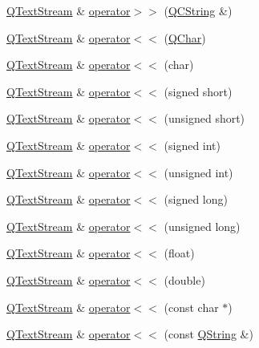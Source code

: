\begin{DoxyCompactItemize}
\hyperlink{class_q_text_stream}{Q\+Text\+Stream} \& \hyperlink{class_q_text_stream_aea7cbf9e70a47fa15f3091fb26d7263d}{operator$>$$>$} (\hyperlink{class_q_c_string}{Q\+C\+String} \&)
\item 
\hyperlink{class_q_text_stream}{Q\+Text\+Stream} \& \hyperlink{class_q_text_stream_a8382325a2a4bd29dc51bf49d8756fc66}{operator$<$$<$} (\hyperlink{class_q_char}{Q\+Char})
\item 
\hyperlink{class_q_text_stream}{Q\+Text\+Stream} \& \hyperlink{class_q_text_stream_aa4ca816ce1b8a1cb25e3d9dfc1d7c4df}{operator$<$$<$} (char)
\item 
\hyperlink{class_q_text_stream}{Q\+Text\+Stream} \& \hyperlink{class_q_text_stream_a09fa4090716c81548496f5f344c61a61}{operator$<$$<$} (signed short)
\item 
\hyperlink{class_q_text_stream}{Q\+Text\+Stream} \& \hyperlink{class_q_text_stream_a678a728c8ea87eacb59c32f58bf33d9a}{operator$<$$<$} (unsigned short)
\item 
\hyperlink{class_q_text_stream}{Q\+Text\+Stream} \& \hyperlink{class_q_text_stream_af4d8f73d592e7dbf1009381c3795bc0b}{operator$<$$<$} (signed int)
\item 
\hyperlink{class_q_text_stream}{Q\+Text\+Stream} \& \hyperlink{class_q_text_stream_aff4f8bd3513a371838b5ec20be5a5889}{operator$<$$<$} (unsigned int)
\item 
\hyperlink{class_q_text_stream}{Q\+Text\+Stream} \& \hyperlink{class_q_text_stream_a35f51b32c584d1e703e1127c8273510d}{operator$<$$<$} (signed long)
\item 
\hyperlink{class_q_text_stream}{Q\+Text\+Stream} \& \hyperlink{class_q_text_stream_a867f2838d846bc4472ddb5a48f254885}{operator$<$$<$} (unsigned long)
\item 
\hyperlink{class_q_text_stream}{Q\+Text\+Stream} \& \hyperlink{class_q_text_stream_a96b4cb3f67559c1e464f3b03c83a1d67}{operator$<$$<$} (float)
\item 
\hyperlink{class_q_text_stream}{Q\+Text\+Stream} \& \hyperlink{class_q_text_stream_a1e5488fd0334c9fe8200fb1727e3a72e}{operator$<$$<$} (double)
\item 
\hyperlink{class_q_text_stream}{Q\+Text\+Stream} \& \hyperlink{class_q_text_stream_a7c02cd21c226d98bfb1dc18851f500a9}{operator$<$$<$} (const char $\ast$)
\item 
\hyperlink{class_q_text_stream}{Q\+Text\+Stream} \& \hyperlink{class_q_text_stream_a71fe2107025a308c699e666522a83b8f}{operator$<$$<$} (const \hyperlink{class_q_string}{Q\+String} \&)
\item 

\end{DoxyCompactItemize}
